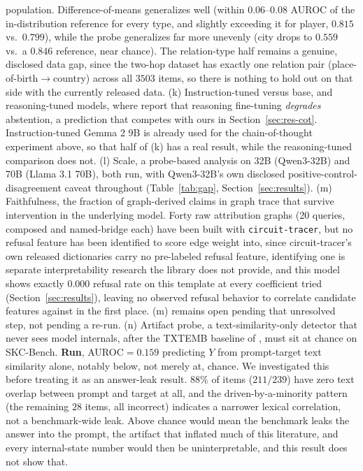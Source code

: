 \documentclass{article}
\begin{document}
population. Difference-of-means generalizes well (within $0.06$--$0.08$ AUROC of the in-distribution
reference for every type, and slightly exceeding it for player, $0.815$ vs.\ $0.799$), while the probe
generalizes far more unevenly (city drops to $0.559$ vs.\ a $0.846$ reference, near chance). The
relation-type half remains a genuine, disclosed data gap, since the two-hop dataset has exactly one
relation pair (place-of-birth$\to$country) across all $3503$ items, so there is nothing to hold out on
that side with the currently released data.
(k) Instruction-tuned versus base, and reasoning-tuned models, where
\citet{kirichenko2025abstentionbench} report that reasoning fine-tuning \emph{degrades} abstention, a
prediction that competes with ours in Section~\ref{sec:res-cot}. Instruction-tuned Gemma 2 9B is
already used for the chain-of-thought experiment above, so that half of (k) has a real result, while
the reasoning-tuned comparison does not. (l) Scale, a probe-based analysis on 32B (Qwen3-32B) and 70B (Llama 3.1 70B), both run, with
Qwen3-32B's own disclosed positive-control-disagreement caveat throughout (Table~\ref{tab:gap}, Section~\ref{sec:results}).
(m) Faithfulness, the fraction of graph-derived claims in graph trace that survive intervention
in the underlying model. Forty raw attribution graphs (20 queries, composed and named-bridge each)
have been built with \texttt{circuit-tracer}, but no refusal feature has been identified to score
edge weight into, since circuit-tracer's own released dictionaries carry no pre-labeled refusal feature,
identifying one is separate interpretability research the library does not provide, and this model
shows exactly $0.000$ refusal rate on this template at every coefficient tried (Section~\ref{sec:results}), leaving no
observed refusal behavior to correlate candidate features against in the first place. (m) remains
open pending that unresolved step, not pending a re-run. (n) Artifact probe, a
text-similarity-only detector that never sees model internals, after the TXTEMB baseline of
\citet{hussain2026parallax}, must sit at chance on SKC-Bench. \textbf{Run}, AUROC$=0.159$ predicting
$Y$ from prompt-target text similarity alone, notably below, not merely at, chance. We investigated
this before treating it as an answer-leak result. $88\%$ of items ($211/239$) have zero text overlap
between prompt and target at all, and the driven-by-a-minority pattern (the remaining $28$ items,
all incorrect) indicates a narrower lexical correlation, not a benchmark-wide leak. Above chance would
mean the benchmark leaks the answer into the prompt, the artifact that inflated much of this
literature, and every internal-state number would then be uninterpretable, and this result does not
show that.
\end{document}
